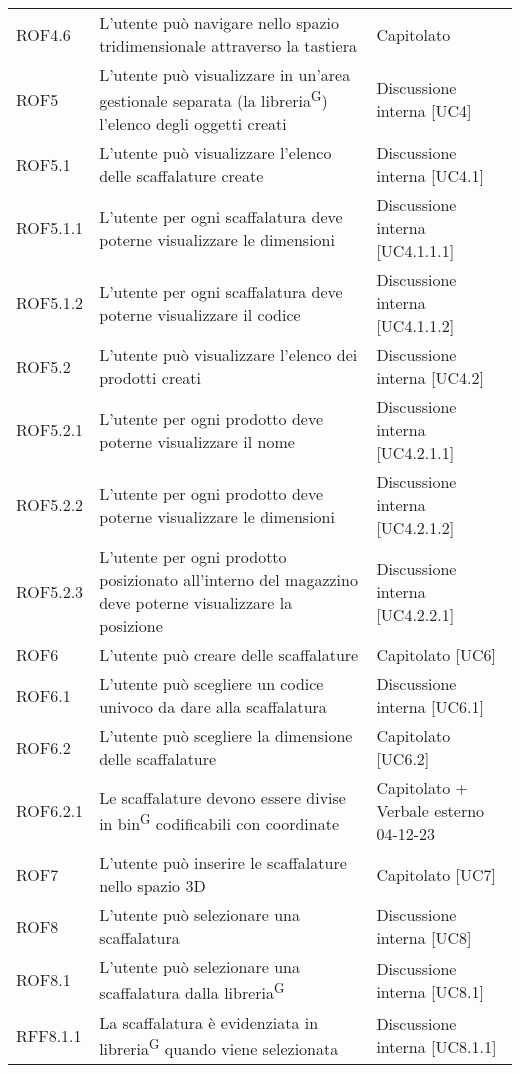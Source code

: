 \begin{xltabular}{\textwidth}{ p{0.2\textwidth} | X | p{0.2\textwidth} }
    ROF4.6& L'utente può navigare nello spazio tridimensionale attraverso la tastiera& Capitolato\\
    ROF5& L'utente può visualizzare in un'area gestionale separata (la libreria\textsuperscript{G}) l'elenco degli oggetti creati & Discussione interna [UC4] \\
    ROF5.1& L'utente può visualizzare l'elenco delle scaffalature create & Discussione interna [UC4.1] \\
    ROF5.1.1& L'utente per ogni scaffalatura deve poterne visualizzare le dimensioni & Discussione interna [UC4.1.1.1]\\
    ROF5.1.2& L'utente per ogni scaffalatura deve poterne visualizzare il codice & Discussione interna [UC4.1.1.2]\\
    ROF5.2& L'utente può visualizzare l'elenco dei prodotti creati & Discussione interna [UC4.2] \\
    ROF5.2.1& L'utente per ogni prodotto deve poterne visualizzare il nome & Discussione interna [UC4.2.1.1]\\
    ROF5.2.2& L'utente per ogni prodotto deve poterne visualizzare le dimensioni & Discussione interna [UC4.2.1.2]\\
    ROF5.2.3& L'utente per ogni prodotto posizionato all'interno del magazzino deve poterne visualizzare la posizione & Discussione interna [UC4.2.2.1] \\
    ROF6& L'utente può creare delle scaffalature & Capitolato [UC6]\\
    ROF6.1& L'utente può scegliere un codice univoco da dare alla scaffalatura & Discussione interna [UC6.1]\\
    ROF6.2& L'utente può scegliere la dimensione delle scaffalature & Capitolato [UC6.2]\\
    ROF6.2.1& Le scaffalature devono essere divise in bin\textsuperscript{G} codificabili con coordinate & Capitolato + Verbale esterno 04-12-23\\
    ROF7& L'utente può inserire le scaffalature nello spazio 3D & Capitolato [UC7]\\
    ROF8& L'utente può selezionare una scaffalatura & Discussione interna [UC8]\\
    ROF8.1& L'utente può selezionare una scaffalatura dalla libreria\textsuperscript{G} & Discussione interna [UC8.1]\\
    RFF8.1.1& La scaffalatura è evidenziata in libreria\textsuperscript{G} quando viene selezionata & Discussione interna [UC8.1.1]\\

\end{xltabular}
